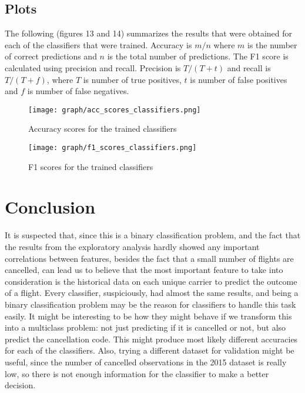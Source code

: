 \documentclass{article}
\begin{document}
		\subsection{Plots}
			The following (figures 13 and 14) summarizes the results that were obtained for each of the classifiers that were trained. Accuracy is $m/n$ where $m$ is the number of correct predictions and $n$ is the total number of predictions. The F1 score is calculated using precision and recall. Precision is $T/(T + t)$ and recall is $T/(T + f)$, where $T$ is number of true positives, $t$ is number of false positives and $f$ is number of false negatives.
			\begin{figure}[H]
				\center
		      \texttt{[image: graph/acc\_scores\_classifiers.png]}
		      \caption{Accuracy scores for the trained classifiers}
		      \label{fig:graph10}
		    \end{figure}\newline
			\begin{figure}[H]
				\center
		      \texttt{[image: graph/f1\_scores\_classifiers.png]}
		      \caption{F1 scores for the trained classifiers}
		      \label{fig:graph11}
		    \end{figure}\newline

    \section{Conclusion}
		It is suspected that, since this is a binary classification problem, and the fact that the results from the exploratory analysis hardly showed any important correlations between features, besides the fact that a small number of flights are cancelled, can lead us to believe that the most important feature to take into consideration is the historical data on each unique carrier to predict the outcome of a flight. Every classifier, suspiciously, had almost the same results, and being a binary classification problem may be the reason for classifiers to handle this task easily. It might be interesting to be how they might behave if we transform this into a multiclass problem: not just predicting if it is cancelled or not, but also predict the cancellation code. This might produce most likely different accuracies for each of the classifiers. Also, trying a different dataset for validation might be useful, since the number of cancelled observations in the 2015 dataset is really low, so there is not enough information for the classifier to make a better decision.
\end{document}
